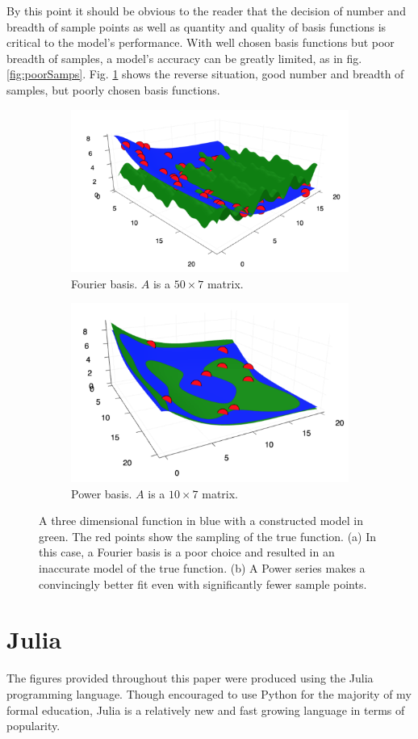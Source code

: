 \par By this point it should be obvious to the reader that the decision of number and breadth of sample points as well as quantity and quality of basis functions is critical to the model's performance. With well chosen basis functions but poor breadth of samples, a model's accuracy can be greatly limited, as in fig. \ref{fig:poorSamps}. Fig. \ref{fig:3dFourier} shows the reverse situation, good number and breadth of samples, but poorly chosen basis functions. 

\begin{figure}
  \centering
  \begin{subfigure}{0.53\textwidth}
    \includegraphics[width=\linewidth]{Figures/3dFourier}
    \caption{Fourier basis. $A$ is a $50\times7$ matrix.} 
    \label{fig:3dFourier}
  \end{subfigure}%
  \hspace*{\fill}
  \begin{subfigure}{0.5\textwidth}
    \includegraphics[width=\linewidth]{Figures/3dPower}
    \caption{Power basis. $A$ is a $10\times7$ matrix.} 
    \label{fig:3dPower}
  \end{subfigure}%
\caption{A three dimensional function in blue with a constructed model in green. The red points show the sampling of the true function. (a) In this case, a Fourier basis is a poor choice and resulted in an inaccurate model of the true function. (b) A Power series makes a convincingly better fit even with significantly fewer sample points.} \label{fig:3dFit}
\end{figure}


\section{Julia}\label{Sect:julia}
The figures provided throughout this paper were produced using the Julia programming language. Though encouraged to use Python for the majority of my formal education, Julia is a relatively new and fast growing language in terms of popularity. 
